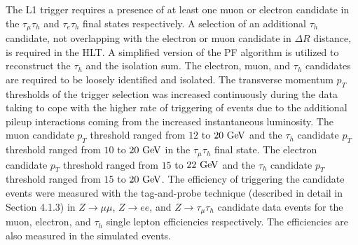 The L1 trigger requires a presence of at least one muon or electron candidate in the $\tau_{\mu}\tau_{h}$ and $\tau_{e}\tau_{h}$ final states respectively. A selection of an additional $\tau_h$ candidate, not overlapping with the electron or muon candidate in $\Delta R$ distance, is required in the HLT.  A simplified version of the PF algorithm is utilized to reconstruct the $\tau_h$ and the isolation sum. The  electron, muon, and $\tau_h$ candidates are required to be loosely identified and isolated. The transverse momentum $p_{T}$ thresholds of the trigger selection was increased continuously during the data taking to cope with the higher rate of triggering of events due to the additional pileup interactions coming from the increased instantaneous luminosity. The muon candidate $p_{T}$ threshold ranged from $12$ to $20~\mathrm{Ge\kern -0.1em V}$ and the $\tau_h$ candidate $p_{T}$  threshold ranged from $10$ to $20~\mathrm{Ge\kern -0.1em V}$ in the $\tau_{\mu}\tau_{h}$ final state. The electron candidate $p_{T}$ threshold ranged from $15$ to $22~\mathrm{Ge\kern -0.1em V}$ and the $\tau_h$ candidate  $p_{T}$  threshold ranged from $15$ to $20~\mathrm{Ge\kern -0.1em V}$. The efficiency of triggering the candidate events were measured with the tag-and-probe technique (described in detail in Section 4.1.3) in $Z \rightarrow \mu\mu$,  $Z \rightarrow ee$, and $Z \rightarrow \tau_{\mu}\tau_h$ candidate data events for the muon, electron, and $\tau_h$ single lepton efficiencies respectively. The efficiencies are also measured in the simulated events. 

